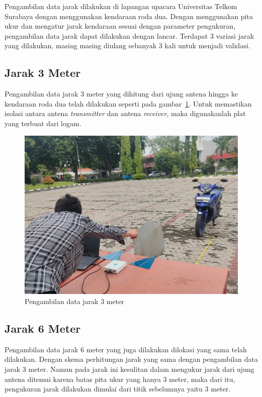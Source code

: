 Pengambilan data jarak dilakukan di lapangan upacara Universitas Telkom Surabaya dengan menggunakan kendaraan roda dua. Dengan menggunakan pita ukur dan mengatur jarak kendaraan sesuai dengan parameter pengukuran, pengambilan data jarak dapat dilakukan dengan lancar. Terdapat 3 variasi jarak yang dilakukan, masing masing diulang sebanyak 3 kali untuk menjadi validasi.

\subsection{Jarak 3 Meter}

Pengambilan data jarak 3 meter yang dihitung dari ujung antena hingga ke kendaraan roda dua telah dilakukan seperti pada gambar~\ref{fig:pengambilan3Meter}. Untuk memastikan isolasi antara antena \textit{transmitter} dan antena \textit{receiver}, maka digunakanlah plat yang terbuat dari logam.

\begin{figure}
	\centering
	\includegraphics[scale=0.1]{pics/bab4/PengujianRange/3/Masuk.jpg}
	\caption{Pengambilan data jarak 3 meter}
	\label{fig:pengambilan3Meter}
\end{figure}

\subsection{Jarak 6 Meter}

Pengambilan data jarak 6 meter yang juga dilakukan dilokasi yang sama telah dilakukan. Dengan skema perhitungan jarak yang sama dengan pengambilan data jarak 3 meter. Namun pada jarak ini kesulitan dalam mengukur jarak dari ujung antena ditemui karena batas pita ukur yang hanya 3 meter, maka dari itu, pengukuran jarak dilakukan dimulai dari titik sebelumnya yaitu 3 meter.

